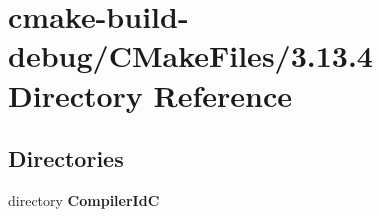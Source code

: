 \section{cmake-\/build-\/debug/\+C\+Make\+Files/3.13.4 Directory Reference}
\label{dir_583c452e78604b986805927f24c840e3}
\subsection*{Directories}
\begin{DoxyCompactItemize}
\item 
directory {\bf Compiler\+IdC}
\end{DoxyCompactItemize}
